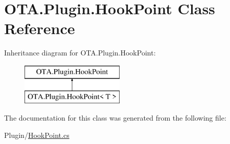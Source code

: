 \hypertarget{class_o_t_a_1_1_plugin_1_1_hook_point}{}\section{O\+T\+A.\+Plugin.\+Hook\+Point Class Reference}
\label{class_o_t_a_1_1_plugin_1_1_hook_point}
Inheritance diagram for O\+T\+A.\+Plugin.\+Hook\+Point\+:\begin{figure}[H]
\begin{center}
\leavevmode
\includegraphics[height=2.000000cm]{class_o_t_a_1_1_plugin_1_1_hook_point}
\end{center}
\end{figure}


The documentation for this class was generated from the following file\+:\begin{DoxyCompactItemize}
\item 
Plugin/\hyperlink{_hook_point_8cs}{Hook\+Point.\+cs}\end{DoxyCompactItemize}
